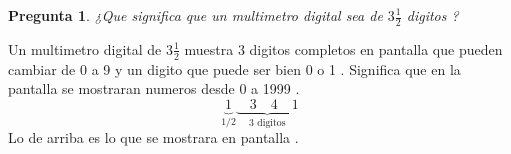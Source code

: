 \documentclass[a4paper,12pt]{article}
\newtheorem{preg}{Pregunta} %
\begin{document}
\begin{preg}
¿Que significa que un multimetro digital sea de $3\frac{1}{2}$ digitos ? 
\end{preg}
Un multimetro digital de $ 3 \frac{1}{2} $ muestra 3 digitos completos en pantalla que pueden cambiar de 0 a 9 y un digito que puede ser bien 0 o 1 . Significa que en la pantalla se mostraran numeros desde 0 a 1999 .
$$
\underbrace{1}_{1/2} \underbrace{\quad 3 \quad 4 \quad 1 }_{3 \mbox{ digitos} }
$$
Lo de arriba es lo que se mostrara en pantalla . 
\end{document}

